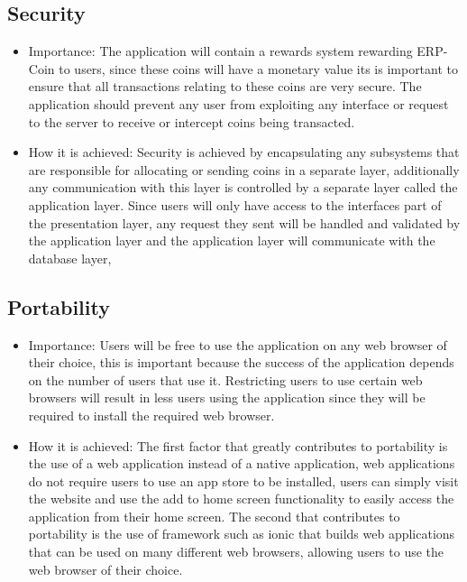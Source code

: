 \documentclass{article}
\begin{document}
\subsection{Security}
\begin{itemize}
\item Importance: The application will contain a rewards system rewarding ERP-Coin to users, since these coins will have a monetary value its is important to ensure that all transactions relating to these coins are very secure. The application should prevent any user from exploiting any interface or request to the server to receive or intercept coins being transacted.
\item How it is achieved: Security is achieved by encapsulating any subsystems that are responsible for allocating or sending coins in a separate layer, additionally any communication with this layer is controlled by a separate layer called the application layer. Since users will only have access to the interfaces part of the presentation layer, any request they sent will be handled and validated by the application layer and the application layer will communicate with the database layer, 
\end{itemize}

\subsection{Portability}
\begin{itemize}
\item Importance: Users will be free to use the application on any web browser of their choice, this is important because the success of the application depends on the number of users that use it. Restricting users to use certain web browsers will result in less users using the application since they will be required to install the required web browser. 
\item How it is achieved: The first factor that greatly contributes to portability is the use of a web application instead of a native application, web applications do not require users to use an app store to be installed, users can simply visit the website and use the add to home screen functionality to easily access the application from their home screen. The second that contributes to portability is the use of framework such as ionic that builds web applications that can be used on many different web browsers, allowing users to use the web browser of their choice.
\end{itemize}
\vspace{4em}
\end{document}

